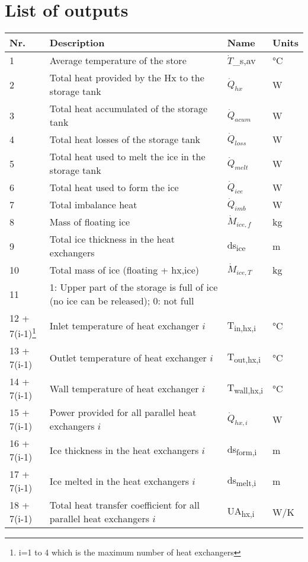 \documentclass[english]{SPFReport}
\begin{document}
\section{List of outputs}

\begin{longtable}{| l |  m{8cm} | l | l |}
\hline
\textbf{Nr.} & \textbf{Description}  & \textbf{Name}& \textbf{Units} \\
\hline
1  & Average temperature of the store & \si{$\dot T$_{s,av}} &\si{\degreeCelsius}   \\
2  & Total heat provided by the Hx to the storage tank & \si{$\dot Q_{hx}$}& W \\
3  & Total heat accumulated  of the storage tank& \si{$\dot Q_{acum}$} & W \\
4 & Total heat losses of the storage tank& \si{$\dot Q_{loss}$} & W \\
5 & Total heat used to melt the ice in the storage tank& \si{$\dot Q_{melt}$} & W \\
6 & Total heat used to form the ice & \si{$\dot Q_{ice}$} & W \\
7 & Total imbalance heat & \si{$\dot Q_{imb}$} & W \\
8 & Mass of floating ice & \si{$\dot M_{ice,f}$} & kg \\
9 & Total ice thickness in the heat exchangers & \si{ds_{ice}} & m \\
10 & Total mass of ice (floating + hx,ice) & \si{$\dot M_{ice,T}$} & kg \\
11 & 1: Upper part of the storage is full of ice (no ice can be released); 0: not full &  &\\
\small{12 + 7(i-1)\footnote{i=1 to 4 which is the maximum number of heat exchangers}} & Inlet temperature of heat exchanger $i$ & \si{T_{in,hx,i}} &\si{\degreeCelsius} \\
\small{13 + 7(i-1)} & Outlet temperature of heat exchanger $i$ & \si{T_{out,hx,i}} &\si{\degreeCelsius} \\
\small{14 + 7(i-1) }& Wall temperature of heat exchanger $i$ & \si{T_{wall,hx,i}} &\si{\degreeCelsius}\\
\small{15 + 7(i-1)} & Power provided for all parallel heat exchangers $i$ & \si{$\dot Q_{hx,i}$} & W \\
\small{16 + 7(i-1)} &  Ice thickness in the heat exchangers $i$ & \si{ds_{form,i}} & m \\
\small{17 + 7(i-1)} &  Ice melted in the heat exchangers $i$ & \si{ds_{melt,i}} & m \\
\small{18 + 7(i-1)} & Total heat transfer coefficient for all parallel heat exchangers $i$ & \si{UA_{hx,i}} & W/K\\

\end{longtable}
\end{document}
